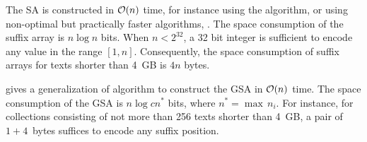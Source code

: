 The SA is constructed in $\mathcal{O}(n)$ time, for instance using the \citep{Kaerkkaeinen2003} algorithm, or using non-optimal but practically faster algorithms, \eg \citep{Schuermann2007}.
The space consumption of the suffix array is $n \log{n}$ bits.
When $n < 2^{32}$, a 32 bit integer is sufficient to encode any value in the range $[1,n]$.
Consequently, the space consumption of suffix arrays for texts shorter than 4~GB is $4 n$ bytes.

\cite{Weese2013} gives a generalization of \citeauthor{Kaerkkaeinen2003} algorithm to construct the GSA in $\mathcal{O}(n)$ time.
The space consumption of the GSA is $n \log{cn^*}$ bits, where $n^* = \max{\,n_i}$.
For instance, for collections consisting of not more than 256 texts shorter than 4~GB, a pair of $1+4$~bytes suffices to encode any suffix position.


